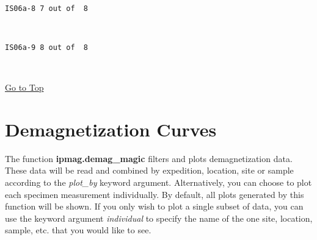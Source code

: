 \documentclass{article}
\begin{document}
{    \begin{center}
    \end{center}
    { \hspace*{\fill} \\}
    
    \begin{Verbatim}[commandchars=\\\{\}]
IS06a-8 7 out of  8
    \end{Verbatim}

    \begin{center}
    \end{center}
    { \hspace*{\fill} \\}
    
    \begin{Verbatim}[commandchars=\\\{\}]
IS06a-9 8 out of  8
    \end{Verbatim}

    \begin{center}
    \end{center}
    { \hspace*{\fill} \\}
    
    \hyperref[Jupyter-notebook-demonstrating-the-use-of-additional-PmagPy-functions]{Go
to Top}

    \section{Demagnetization Curves}\label{demagnetization-curves}

    The function \textbf{ipmag.demag\_magic} filters and plots
demagnetization data. These data will be read and combined by
expedition, location, site or sample according to the \textit{plot\_by}
keyword argument. Alternatively, you can choose to plot each specimen
measurement individually. By default, all plots generated by this
function will be shown. If you only wish to plot a single subset of
data, you can use the keyword argument \textit{individual} to specify the
name of the one site, location, sample, etc. that you would like to see.

}
\end{document}

